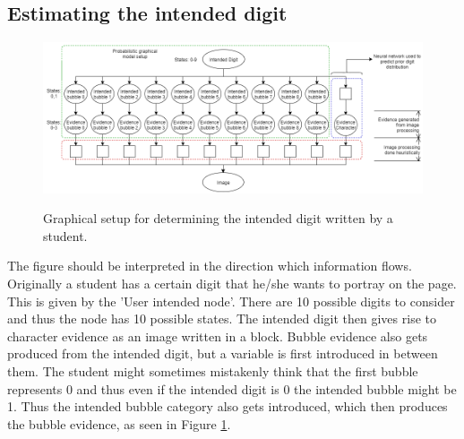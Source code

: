 \subsection{Estimating the intended digit}
\label{sec:studentDigit}

\begin{figure}
  \centering
  \includegraphics[width=16cm]{pgmDigit}\\
  \caption{Graphical setup for determining the intended digit written by a student.}
  \label{fig:pgmDigit}
\end{figure}

The figure should be interpreted in the direction which information flows. Originally a student has a certain digit that he/she wants to portray on the page. This is given by the 'User intended node'. There are 10 possible digits to consider and thus the node has 10 possible states. The intended digit then gives rise to character evidence as an image written in a block. Bubble evidence also gets produced from the intended digit, but a variable is first introduced in between them. The student might sometimes mistakenly think that the first bubble represents 0 and thus even if the intended digit is 0 the intended bubble might be 1. Thus the intended bubble category also gets introduced, which then produces the bubble evidence, as seen in Figure \ref{fig:pgmDigit}.  



